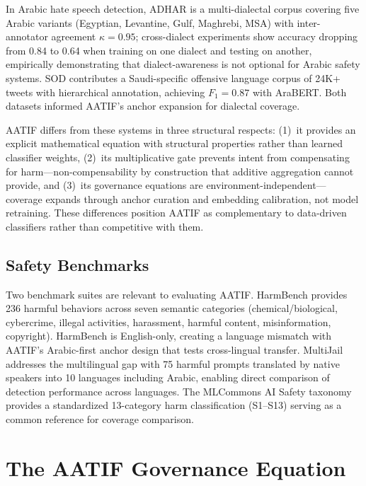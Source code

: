 \documentclass[11pt,a4paper]{article}
\begin{document}
In Arabic hate speech detection, ADHAR \citep{adhar2024} is a multi-dialectal corpus covering five Arabic variants (Egyptian, Levantine, Gulf, Maghrebi, MSA) with inter-annotator agreement $\kappa = 0.95$; cross-dialect experiments show accuracy dropping from 0.84 to 0.64 when training on one dialect and testing on another, empirically demonstrating that dialect-awareness is not optional for Arabic safety systems. SOD \citep{sod2024} contributes a Saudi-specific offensive language corpus of 24K+ tweets with hierarchical annotation, achieving $F_1 = 0.87$ with AraBERT. Both datasets informed AATIF's anchor expansion for dialectal coverage.

AATIF differs from these systems in three structural respects: (1)~it provides an explicit mathematical equation with structural properties rather than learned classifier weights, (2)~its multiplicative gate prevents intent from compensating for harm---non-compensability by construction that additive aggregation cannot provide, and (3)~its governance equations are environment-independent---coverage expands through anchor curation and embedding calibration, not model retraining. These differences position AATIF as complementary to data-driven classifiers rather than competitive with them.

\subsection{Safety Benchmarks}

Two benchmark suites are relevant to evaluating AATIF. HarmBench \citep{harmbench2024} provides 236 harmful behaviors across seven semantic categories (chemical/biological, cybercrime, illegal activities, harassment, harmful content, misinformation, copyright). HarmBench is English-only, creating a language mismatch with AATIF's Arabic-first anchor design that tests cross-lingual transfer. MultiJail \citep{multijail2024} addresses the multilingual gap with 75 harmful prompts translated by native speakers into 10 languages including Arabic, enabling direct comparison of detection performance across languages. The MLCommons AI Safety taxonomy \citep{mlcommons2024} provides a standardized 13-category harm classification (S1--S13) serving as a common reference for coverage comparison.


\section{The AATIF Governance Equation}
\label{sec:equation}
\end{document}
